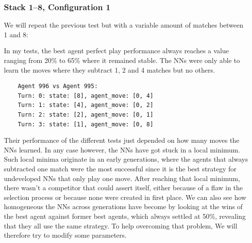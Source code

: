 \documentclass[11pt]{report}
\begin{document}
\begin{enumerate}
    \subsubsection{Stack 1--8, Configuration 1}
    We will repeat the previous test but with a variable amount of matches between 1 and 8:
    \renewcommand{\csvpath}{../data/simple_nim/stack_8r/t_1.2/stats.csv} %
    \begin{center}
    \end{center}
    In my tests, the best agent perfect play performance always reaches a value ranging from 20\% to 65\% where it remained stable.
    The NNs were only able to learn the moves where they subtract 1, 2 and 4 matches but no others.
    \begin{verbatim}
    Agent 996 vs Agent 995:
    Turn: 0: state: [8], agent_move: [0, 4]
    Turn: 1: state: [4], agent_move: [0, 2]
    Turn: 2: state: [2], agent_move: [0, 1]
    Turn: 3: state: [1], agent_move: [0, 8]
    \end{verbatim}
    Their performance of the different tests just depended on how many moves the NNs learned.
    In any case however, the NNs have got stuck in a local minimum.
    Such local minima originate in an early generations, where the agents that always subtracted one match were the most successful since it is the best strategy for undeveloped NNs that only play one move.
    After reaching that local minimum, there wasn't a competitor that could assert itself, either because of a flaw in the selection process or because none were created in first place.
    We can also see how homogeneous the NNs across generations have become by looking at the wins of the best agent against former best agents, which always settled at 50\%, revealing that they all use the same strategy.
    To help overcoming that problem, We will therefore try to modify some parameters.
    

\end{enumerate}
\end{document}
